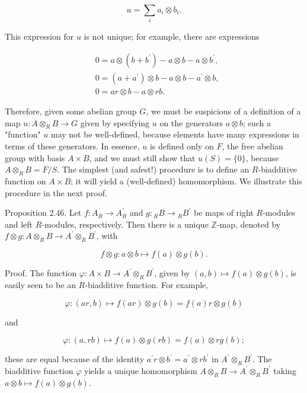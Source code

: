 \documentclass[10pt, letterpaper]{article}
\begin{document}
$$
u=\sum_{i} a_{i} \otimes b_{i} .
$$

This expression for $u$ is not unique; for example, there are expressions

$$
\begin{aligned}
& 0=a \otimes\left(b+b^{\prime}\right)-a \otimes b-a \otimes b^{\prime}, \\
& 0=\left(a+a^{\prime}\right) \otimes b-a \otimes b-a^{\prime} \otimes b, \\
& 0=a r \otimes b-a \otimes r b .
\end{aligned}
$$

Therefore, given some abelian group $G$, we must be suspicious of a definition of a map $u: A \otimes_{R} B \rightarrow G$ given by specifying $u$ on the generators $a \otimes b$; such a "function" $u$ may not be well-defined, because elements have many expressions in terms of these generators. In essence, $u$ is defined only on $F$, the free abelian group with basis $A \times B$, and we must still show that $u(S)=\{0\}$, because $A \otimes_{R} B=F / S$. The simplest (and safest!) procedure is to define an $R$-biadditive function on $A \times B$; it will yield a (well-defined) homomorphism. We illustrate this procedure in the next proof.

Proposition 2.46. Let $f: A_{R} \rightarrow A_{R}^{\prime}$ and $g:{ }_{R} B \rightarrow{ }_{R} B^{\prime}$ be maps of right $R$-modules and left $R$-modules, respectively. Then there is a unique $\mathbb{Z}$-map, denoted by $f \otimes g: A \otimes_{R} B \rightarrow A^{\prime} \otimes_{R} B^{\prime}$, with

$$
f \otimes g: a \otimes b \mapsto f(a) \otimes g(b) .
$$

Proof. The function $\varphi: A \times B \rightarrow A^{\prime} \otimes_{R} B^{\prime}$, given by $(a, b) \mapsto f(a) \otimes g(b)$, is easily seen to be an $R$-biadditive function. For example,

$$
\varphi:(a r, b) \mapsto f(a r) \otimes g(b)=f(a) r \otimes g(b)
$$

and

$$
\varphi:(a, r b) \mapsto f(a) \otimes g(r b)=f(a) \otimes r g(b) ;
$$

these are equal because of the identity $a^{\prime} r \otimes b^{\prime}=a^{\prime} \otimes r b^{\prime}$ in $A^{\prime} \otimes_{R} B^{\prime}$. The biadditive function $\varphi$ yields a unique homomorphism $A \otimes_{R} B \rightarrow A^{\prime} \otimes_{R} B^{\prime}$ taking $a \otimes b \mapsto f(a) \otimes g(b)$.
\end{document}
